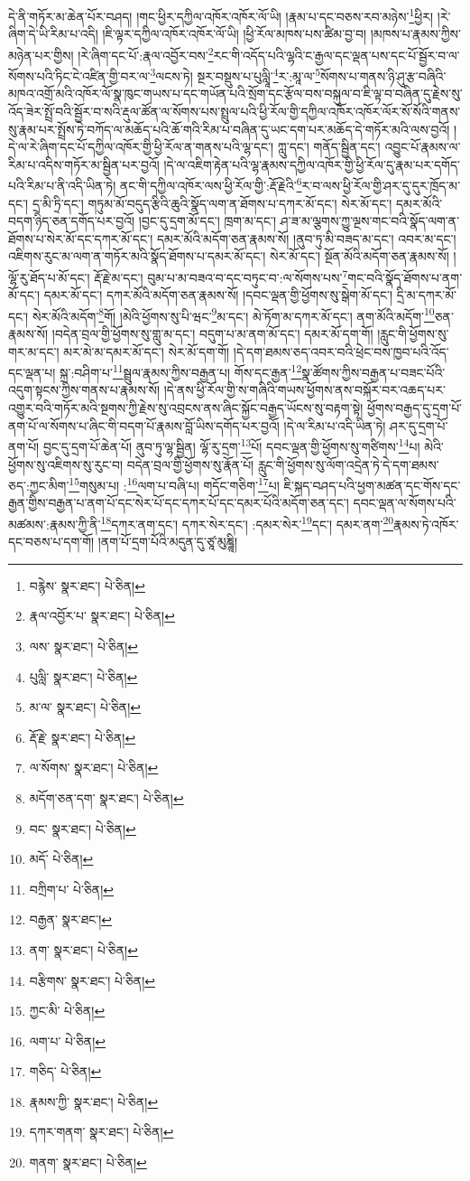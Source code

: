 དེ་ནི་གཏོར་མ་ཆེན་པོར་བཤད། །གང་ཕྱིར་དཀྱིལ་འཁོར་འཁོར་ལོ་ཡི། །རྣམ་པ་དང་བཅས་རབ་མཉེས་\footnote{བརྙེས་  སྣར་ཐང་།  པེ་ཅིན། }ཕྱིར། །རེ་ཞིག་དེ་ཡི་རིམ་པ་འདི། །ཇི་ལྟར་དཀྱིལ་འཁོར་འཁོར་ལོ་ཡི། །ཕྱི་རོལ་མཁས་པས་ཚིམ་བྱ་བ། །མཁས་པ་རྣམས་ཀྱིས་མཉེན་པར་གྱིས། །རེ་ཞིག་དང་པོ་:རྣལ་འབྱོར་བས་\footnote{རྣལ་འབྱོར་པ་  སྣར་ཐང་།  པེ་ཅིན། }རང་གི་འདོད་པའི་ལྷའི་ང་རྒྱལ་དང་ལྡན་པས་དང་པོ་སྦྱོར་བ་ལ་སོགས་པའི་ཏིང་ངེ་འཛིན་གྱི་བར་ལ་\footnote{ལས་  སྣར་ཐང་།  པེ་ཅིན། }ལངས་ཏེ། སྔར་བསྡུས་པ་པུལླཱི་\footnote{པུལླི་  སྣར་ཐང་།  པེ་ཅིན། }ར་:མཱ་ལ་\footnote{མ་ལ་  སྣར་ཐང་།  པེ་ཅིན། }སོགས་པ་གནས་ཉི་ཤུ་རྩ་བཞིའི་མཁའ་འགྲོ་མའི་འཁོར་ལོ་སྣ་ཁུང་གཡས་པ་དང་གཡོན་པའི་སྲོག་དང་རྩོལ་བས་བསྐུལ་བ་ཇི་ལྟ་བ་བཞིན་དུ་རྗེས་སུ་འོད་ཟེར་སྤྲོ་བའི་སྦྱོར་བ་སའི་རྡུལ་ཚོན་ལ་སོགས་པས་སྤྲུལ་པའི་ཕྱི་རོལ་གྱི་དཀྱིལ་འཁོར་འཁོར་ལོར་སོ་སོའི་གནས་སུ་རྣམ་པར་སྤྲོས་ཏེ་བཀོད་ལ་མཆོད་པའི་ཆོ་གའི་རིམ་པ་བཞིན་དུ་ཡང་དག་པར་མཆོད་དེ་གཏོར་མའི་ལས་བྱའོ། །དེ་ལ་རེ་ཞིག་དང་པོ་དཀྱིལ་འཁོར་གྱི་ཕྱི་རོལ་ན་གནས་པའི་ལྷ་དང་། ཀླུ་དང་། གནོད་སྦྱིན་དང་། འབྱུང་པོ་རྣམས་ལ་རིམ་པ་འདིས་གཏོར་མ་སྦྱིན་པར་བྱའོ། །དེ་ལ་འཇིག་རྟེན་པའི་ལྷ་རྣམས་དཀྱིལ་འཁོར་གྱི་ཕྱི་རོལ་དུ་རྣམ་པར་དགོད་པའི་རིམ་པ་ནི་འདི་ཡིན་ཏེ། ནང་གི་དཀྱིལ་འཁོར་ལས་ཕྱི་རོལ་གྱི་:རྡོ་རྗེའི་\footnote{རྡོ་རྗེ་  སྣར་ཐང་།  པེ་ཅིན། }ར་བ་ལས་ཕྱི་རོལ་གྱི་ཤར་དུ་དུར་ཁྲོད་མ་དང་། དྲ་མི་ཏྲི་དང་། གཏུམ་མོ་བདུད་རྩིའི་ཆུའི་སྣོད་ལག་ན་ཐོགས་པ་དཀར་མོ་དང་། སེར་མོ་དང་། དམར་མོའི་བདག་ཉིད་ཅན་དགོད་པར་བྱའོ། །བྱང་དུ་དྲག་མོ་དང་། ཁྲག་མ་དང་། ཤ་ཟ་མ་ལྕགས་ཀྱུ་ལྔས་གང་བའི་སྣོད་ལག་ན་ཐོགས་པ་སེར་མོ་དང་དཀར་མོ་དང་། དམར་མོའི་མདོག་ཅན་རྣམས་སོ། །ནུབ་ཏུ་མི་བཟད་མ་དང་། འབར་མ་དང་། འཇིགས་རུང་མ་ལག་ན་གཏོར་མའི་སྣོད་ཐོགས་པ་དམར་མོ་དང་། སེར་མོ་དང་། སྔོན་མོའི་མདོག་ཅན་རྣམས་སོ། །ལྷོ་རུ་ཐོད་པ་མོ་དང་། རྡོ་རྗེ་མ་དང་། བུམ་པ་མ་བཟའ་བ་དང་བཏུང་བ་:ལ་སོགས་པས་\footnote{ལ་སོགས་  སྣར་ཐང་།  པེ་ཅིན། }གང་བའི་སྣོད་ཐོགས་པ་ནག་མོ་དང་། དམར་མོ་དང་། དཀར་མོའི་མདོག་ཅན་རྣམས་སོ། །དབང་ལྡན་གྱི་ཕྱོགས་སུ་སྒེག་མོ་དང་། དྲི་མ་དཀར་མོ་དང་། སེར་མོའི་མདོག་\footnote{མདོག་ཅན་དག་  སྣར་ཐང་།  པེ་ཅིན། }གོ། །མེའི་ཕྱོགས་སུ་པི་ཝང་\footnote{བང་  སྣར་ཐང་།  པེ་ཅིན། }མ་དང་། མེ་ཏོག་མ་དཀར་མོ་དང་། ནག་མོའི་མདོག་\footnote{མདོ་  པེ་ཅིན། }ཅན་རྣམས་སོ། །བདེན་བྲལ་གྱི་ཕྱོགས་སུ་གླུ་མ་དང་། བདུག་པ་མ་ནག་མོ་དང་། དམར་མོ་དག་གོ། །རླུང་གི་ཕྱོགས་སུ་གར་མ་དང་། མར་མེ་མ་དམར་མོ་དང་། སེར་མོ་དག་གོ། །དེ་དག་ཐམས་ཅད་འབར་བའི་ཕྲེང་བས་ཁྱབ་པའི་འོད་དང་ལྡན་པ། སྐྲ་:བཤིག་པ་\footnote{བཀྲིག་པ་  པེ་ཅིན། }སྦྲུལ་རྣམས་ཀྱིས་བརྒྱན་པ། གོས་དང་རྒྱན་\footnote{བརྒྱན་  སྣར་ཐང་། }སྣ་ཚོགས་ཀྱིས་བརྒྱན་པ་བཟང་པོའི་འདུག་སྟངས་ཀྱིས་གནས་པ་རྣམས་སོ། །དེ་ནས་ཕྱི་རོལ་གྱི་ས་གཞིའི་གཡས་ཕྱོགས་ནས་བསྐོར་བར་འཆད་པར་འགྱུར་བའི་གཏོར་མའི་སྔགས་ཀྱི་རྗེས་སུ་འབྲངས་ནས་ཞིང་སྐྱོང་བརྒྱད་ཡོངས་སུ་བརྟག་སྟེ། ཕྱོགས་བརྒྱད་དུ་དྲག་པོ་ནག་པོ་ལ་སོགས་པ་ཞིང་གི་བདག་པོ་རྣམས་བློ་ཡིས་དགོད་པར་བྱའོ། །དེ་ལ་རིམ་པ་འདི་ཡིན་ཏེ། ཤར་དུ་དྲག་པོ་ནག་པོ། བྱང་དུ་དྲག་པོ་ཆེན་པོ། ནུབ་ཏུ་ལྷ་སྦྱིན། ལྷོ་རུ་དྲག་\footnote{ནག་  སྣར་ཐང་།  པེ་ཅིན། }པོ། དབང་ལྡན་གྱི་ཕྱོགས་སུ་གཙིགས་\footnote{བརྩིགས་  སྣར་ཐང་།  པེ་ཅིན། }པ། མེའི་ཕྱོགས་སུ་འཇིགས་སུ་རུང་བ། བདེན་བྲལ་གྱི་ཕྱོགས་སུ་རྣོན་པོ། རླུང་གི་ཕྱོགས་སུ་ལོག་འདྲེན་ཏེ་དེ་དག་ཐམས་ཅད་:ཀྱང་མིག་\footnote{ཀྱང་མི་  པེ་ཅིན། }གསུམ་པ། :\footnote{ལག་པ་  པེ་ཅིན། }ལག་པ་བཞི་པ། གདོང་གཅིག་\footnote{གཅིད་  པེ་ཅིན། }པ། ཇི་སྐད་བཤད་པའི་ཕྱག་མཚན་དང་གོས་དང་རྒྱན་གྱིས་བརྒྱན་པ་ནག་པོ་དང་སེར་པོ་དང་དཀར་པོ་དང་དམར་པོའི་མདོག་ཅན་དང་། དབང་ལྡན་ལ་སོགས་པའི་མཚམས་:རྣམས་ཀྱི་ནི་\footnote{རྣམས་ཀྱི་  སྣར་ཐང་།  པེ་ཅིན། }དཀར་ནག་དང་། དཀར་སེར་དང་། :དམར་སེར་\footnote{དཀར་གནག་  སྣར་ཐང་།  པེ་ཅིན། }དང་། དམར་ནག་\footnote{གནག་  སྣར་ཐང་།  པེ་ཅིན། }རྣམས་ཏེ་འཁོར་དང་བཅས་པ་དག་གོ། །ནག་པོ་དྲག་པོའི་མདུན་དུ་ཙཱ་མུཎྜཱི། 